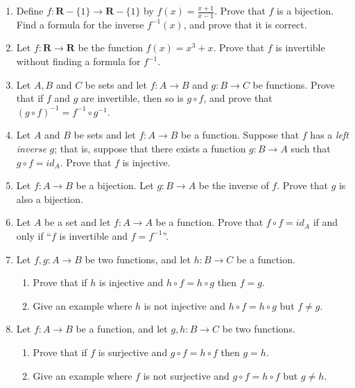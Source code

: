 \documentclass[12pt]{article}
\begin{document}
\begin{enumerate}
\item Define $f \colon \mathbf{R}-\{1\} \to \mathbf{R} - \{1\}$ by $f(x) = \frac{x+1}{x-1}$. Prove that $f$ is a bijection. Find a formula for the inverse $f^{-1}(x)$, and prove that it is correct.
\item Let $f \colon \mathbf{R} \to \mathbf{R}$ be the function $f(x) = x^3 + x$. Prove that $f$ is invertible without finding a formula for $f^{-1}$.
\item Let $A, B$ and $C$ be sets and let $f \colon A \to B$ and $g \colon B \to C$ be functions. Prove that if $f$ and $g$ are invertible, then so is $g \circ f$, and prove that $(g \circ f)^{-1} = f^{-1} \circ g^{-1}$.
\item Let $A$ and $B$ be sets and let $f \colon A \to B$ be a function. Suppose that $f$ has a \emph{left inverse} $g$; that is, suppose that there exists a function $g \colon B \to A$ such that $g \circ f = id_A$. Prove that $f$ is injective.
\item Let $f \colon A \to B$ be a bijection. Let $g \colon B \to A$ be the inverse of $f$. Prove that $g$ is also a bijection.
\item Let $A$ be a set and let $f \colon A \to A$ be a function. Prove that $f \circ f = id_A$ if and only if ``$f$ is invertible and $f = f^{-1}$''.

\item Let $f,g \colon A \to B$ be two functions, and let $h \colon B \to C$ be a function. 
  \begin{enumerate}
  \item Prove that if $h$ is injective and
    $h \circ f = h \circ g$ then $f = g$.
  \item Give an example where $h$ is not injective and     $h \circ f = h \circ g$ but $f \neq g$.
\end{enumerate}
  
\item Let $f \colon A \to B$ be a function, and let $g,h \colon B \to C$ be two functions. 
  \begin{enumerate}
  \item Prove that if $f$ is surjective and
    $g \circ f = h \circ f$ then $g = h$.
  \item Give an example where $f$ is not surjective and $g \circ f = h \circ f$ but $g \neq h$.
\end{enumerate}

\end{enumerate}
\end{document}
